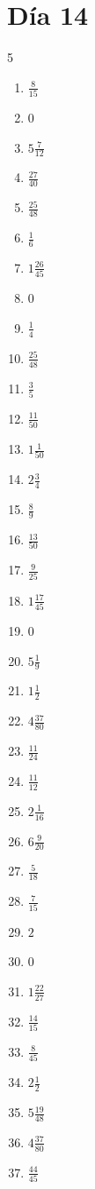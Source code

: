 \documentclass[12pt]{article}
\begin{document}
\section*{Día 14}
\begin{multicols}{5}\begin{enumerate}
\item $ \frac{8}{15} $
\item $ 0 $
\item $ 5 \frac{7}{12} $
\item $ \frac{27}{40} $
\item $ \frac{25}{48} $
\item $ \frac{1}{6} $
\item $ 1 \frac{26}{45} $
\item $ 0 $
\item $ \frac{1}{4} $
\item $ \frac{25}{48} $
\item $ \frac{3}{5} $
\item $ \frac{11}{50} $
\item $ 1 \frac{1}{50} $
\item $ 2 \frac{3}{4} $
\item $ \frac{8}{9} $
\item $ \frac{13}{50} $
\item $ \frac{9}{25} $
\item $ 1 \frac{17}{45} $
\item $ 0 $
\item $ 5 \frac{1}{9} $
\item $ 1 \frac{1}{2} $
\item $ 4 \frac{37}{80} $
\item $ \frac{11}{24} $
\item $ \frac{11}{12} $
\item $ 2 \frac{1}{16} $
\item $ 6 \frac{9}{20} $
\item $ \frac{5}{18} $
\item $ \frac{7}{15} $
\item $ 2 $
\item $ 0 $
\item $ 1 \frac{22}{27} $
\item $ \frac{14}{15} $
\item $ \frac{8}{45} $
\item $ 2 \frac{1}{2} $
\item $ 5 \frac{19}{48} $
\item $ 4 \frac{37}{80} $
\item $ \frac{44}{45} $

\end{enumerate}
\end{multicols}
\end{document}
